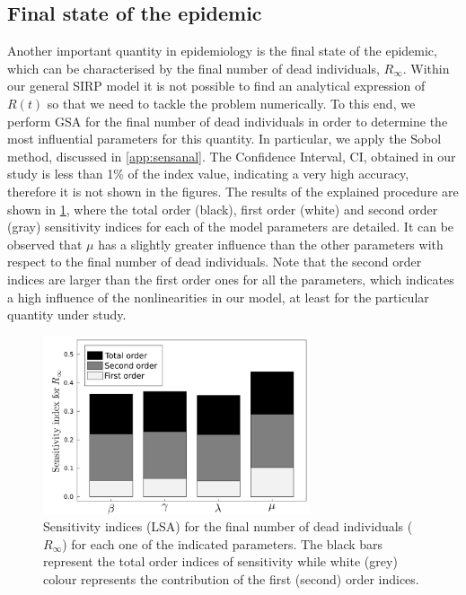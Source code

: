 \subsection{Final state of the epidemic}

Another important quantity in epidemiology is the final state of the
epidemic, which can be characterised by the final number of dead individuals,
$R_\infty$. Within our general SIRP model it is not possible to find an
analytical expression of $R(t)$ so that we need to tackle the problem
numerically. To this end, we perform GSA for the final number of dead
individuals in order to determine the most influential parameters for this
quantity. In particular, we apply the Sobol method, discussed in
\ref{app:sensanal}.
The Confidence Interval, CI, obtained in our
study is less than 1\% of the index value, indicating a very high accuracy,
therefore it is not shown in the figures. The results of the explained
procedure are shown in \cref{fig: GSA_R_inf}, where the total order (black),
first order (white) and second order (gray) sensitivity indices for each of the
model parameters are detailed. It can be observed that $\mu$ has a slightly
greater influence than the other parameters with respect to the final number of
dead individuals. Note that the second order indices are larger than the first
order ones for all the parameters, which indicates a high influence of the
nonlinearities in our model, at least for the particular quantity under study.

\begin{figure}[H]
    \centering
    \includegraphics[width=0.7\textwidth]{Figures/GSA_R_inf.png}
    \caption{Sensitivity indices (LSA) for the final number of dead
        individuals ($R_\infty$) for each one of the indicated parameters. The
        black
        bars represent the total order indices of sensitivity while white
        (grey) colour
        represents the contribution of the first (second) order indices.}
    \label{fig: GSA_R_inf}
\end{figure}

